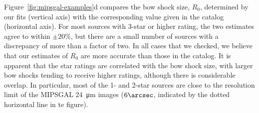 \bigskip
%
Figure~\ref{fig:mipsgal-examples}d compares the bow shock size,
\(R_0\), determined by our fits (vertical axis) with the corresponding
value given in the \citet{Kobulnicky:2016a} catalog (horizontal axis).
For most sources with 3-star or higher rating, the two estimates agree
to within \(\pm 20\%\), but there are a small number of sources with a
discrepancy of more than a factor of two.  In all cases that we
checked, we believe that our estimates of \(R_0\) are more accurate
than those in the catalog.  It is apparent that the star ratings are
correlated with the bow shock size, with larger bow shocks tending to
receive higher ratings, although there is considerable overlap.  In
particular, most of the 1- and 2-star sources are close to the
resolution limit of the MIPSGAL \SI{24}{\um} images (\(6\arcsec\),
indicated by the dotted horizontal line in te figure).

